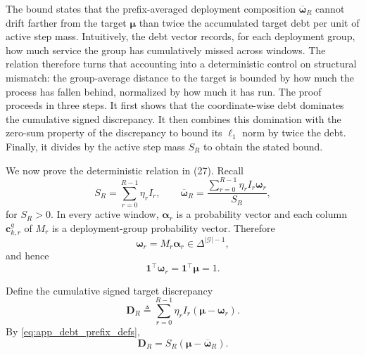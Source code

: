 The bound states that the prefix-averaged deployment composition
$\overline{\boldsymbol\omega}_R$ cannot drift farther from the target
$\boldsymbol\mu$ than twice the accumulated target debt per unit of active
step mass.  Intuitively, the debt vector records, for each deployment group,
how much service the group has cumulatively missed across windows.  The
relation therefore turns that accounting into a deterministic control on
structural mismatch: the group-average distance to the target is bounded by
how much the process has fallen behind, normalized by how much it has run.
The proof proceeds in three steps.  It first shows that the coordinate-wise
debt dominates the cumulative signed discrepancy.  It then combines this
domination with the zero-sum property of the discrepancy to bound its
$\ell_1$ norm by twice the debt.  Finally, it divides by the active step
mass $S_R$ to obtain the stated bound.

We now prove the deterministic relation in
(27).  Recall
\begin{equation}
    S_R
    =
    \sum_{r=0}^{R-1}\eta_rI_r,
    \qquad
    \overline{\boldsymbol\omega}_R
    =
    \frac{
    \sum_{r=0}^{R-1}
    \eta_rI_r\boldsymbol\omega_r
    }{S_R},
    \label{eq:app_debt_prefix_defs}
\end{equation}
for $S_R>0$.  In every active window,
$\boldsymbol\alpha_r$ is a probability vector and each column
$\mathbf{c}_{k,r}^{g}$ of $M_r$ is a deployment-group probability vector.
Therefore
\begin{equation}
    \boldsymbol\omega_r
    =
    M_r\boldsymbol\alpha_r
    \in
    \Delta^{|\mathcal G|-1},
    \label{eq:app_omega_simplex}
\end{equation}
and hence
\begin{equation}
    \mathbf{1}^{\top}\boldsymbol\omega_r
    =
    \mathbf{1}^{\top}\boldsymbol\mu
    =1.
    \label{eq:app_equal_mass}
\end{equation}

Define the cumulative signed target discrepancy
\begin{equation}
    \mathbf{D}_R
    \triangleq
    \sum_{r=0}^{R-1}
    \eta_rI_r
    \left(
    \boldsymbol\mu-\boldsymbol\omega_r
    \right).
    \label{eq:app_DR}
\end{equation}
By \eqref{eq:app_debt_prefix_defs},
\begin{equation}
    \mathbf{D}_R
    =
    S_R
    \left(
    \boldsymbol\mu-\overline{\boldsymbol\omega}_R
    \right).
    \label{eq:app_DR_baromega}
\end{equation}

